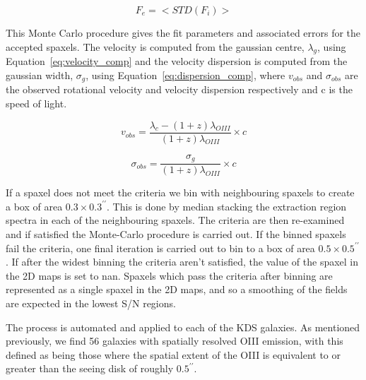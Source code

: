\documentclass[a4paper,fleqn,usenatbib]{mn2e}
\begin{document}
\begin{equation}\label{eq:cube_error}
   F_{e} = \big<STD(F _{i})\big>
\end{equation}

This Monte Carlo procedure gives the fit parameters and associated errors for the accepted spaxels.
The velocity is computed from the gaussian centre, $\lambda_{g}$, using Equation~\ref{eq:velocity_comp} and the velocity dispersion is computed from the gaussian width, $\sigma_{g}$, using Equation~\ref{eq:dispersion_comp}, where $v_{obs}$ and $\sigma_{obs}$ are the observed rotational velocity and velocity dispersion respectively and c is the speed of light.

\begin{equation}\label{eq:velocity_comp}
   v_{obs} = \frac{\lambda_{c} - (1 + z)\lambda_{OIII}}{(1 + z)\lambda_{OIII}} \times c
\end{equation}

\begin{equation}\label{eq:dispersion_comp}
   \sigma_{obs} = \frac{\sigma_{g}}{(1 + z)\lambda_{OIII}} \times c
\end{equation}

If a spaxel does not meet the criteria we bin with neighbouring spaxels to create a box of area $0.3\times0.3^{\prime\prime}$.
This is done by median stacking the extraction region spectra in each of the neighbouring spaxels.
The criteria are then re-examined and if satisfied the Monte-Carlo procedure is carried out. 
If the binned spaxels fail the criteria, one final iteration is carried out to bin to a box of area $0.5\times0.5^{\prime\prime}$.
If after the widest binning the criteria aren't satisfied, the value of the spaxel in the 2D maps is set to nan.
Spaxels which pass the criteria after binning are represented as a single spaxel in the 2D maps, and so a smoothing of the fields are expected in the lowest S/N regions.

The process is automated and applied to each of the KDS galaxies.
As mentioned previously, we find 56 galaxies with spatially resolved OIII emission, with this defined as being those where the spatial extent of the OIII is equivalent to or greater than the seeing disk of roughly $0.5^{\prime\prime}$.
\end{document}
